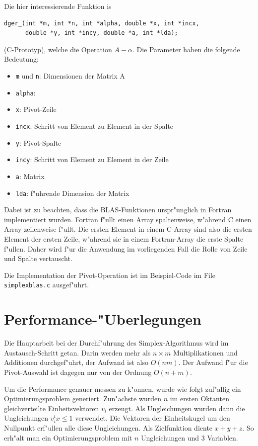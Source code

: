 Die hier interessierende Funktion is
\begin{verbatim}
dger_(int *m, int *n, int *alpha, double *x, int *incx,
      double *y, int *incy, double *a, int *lda);
\end{verbatim}
(C-Prototyp), welche die Operation $A-\alpha $. Die Parameter haben die folgende Bedeutung:
\begin{itemize}
\item {\tt m} und {\tt n}: Dimensionen der Matrix A
\item {\tt alpha}: 
\item {\tt x}: Pivot-Zeile
\item {\tt incx}: Schritt von Element zu Element in der Spalte 
\item {\tt y}: Pivot-Spalte
\item {\tt incy}: Schritt von Element zu Element in der Zeile
\item {\tt a}: Matrix
\item {\tt lda}: f"uhrende Dimension der Matrix
\end{itemize}
Dabei ist zu beachten, dass die BLAS-Funktionen urspr"unglich in Fortran
implementiert wurden.
Fortran f"ullt einen Array spaltenweise, w"ahrend
C einen Array zeilenweise f"ullt.
Die ersten Element in einem C-Array sind also die ersten Element der
ersten Zeile, w"ahrend sie in einem Fortran-Array die erste Spalte
f"ullen. Daher wird f"ur die Anwendung im vorliegenden Fall die Rolle
von Zeile und Spalte vertauscht.

Die Implementation der Pivot-Operation ist im Beispiel-Code im
File {\tt simplexblas.c} ausgef"uhrt.

\section{Performance-"Uberlegungen}
Die Hauptarbeit bei der Durchf"uhrung des Simplex-Algorithmus wird im
Austausch-Schritt getan. Darin werden mehr als $n\times m$ Multiplikationen
und Additionen durchgef"uhrt, der Aufwand ist also $O(nm)$.
Der Aufwand f"ur die Pivot-Auswahl ist dagegen nur von der Ordnung
$O(n+m)$.

Um die Performance genauer messen zu k"onnen, wurde wie folgt zuf"allig
ein Optimierungsproblem generiert.
Zun"achste wurden $n$ im 
ersten Oktanten gleichverteilte Einheitsvektoren $v_i$ erzeugt.
Als Ungleichungen wurden dann die Ungleichungen $v_i^t x\le 1$ 
verwendet. Die Vektoren der Einheitskugel um den Nullpunkt erf"ullen
alle diese Ungleichungen.
Als Zielfunktion diente $x+y+z$. So erh"alt man
ein Optimierungsproblem mit $n$ Ungleichungen und $3$ Variablen.

